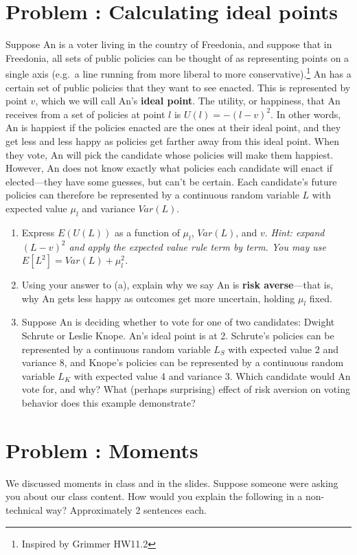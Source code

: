 \documentclass[11pt]{article}
\newcounter{problem}
\newcommand{\problem}[1]{\stepcounter{problem}\section*{Problem \theproblem: #1}}
\begin{document}
\problem{Calculating ideal points}

Suppose An is a voter living in the country of Freedonia, and suppose
that in Freedonia, all sets of public policies can be thought of as
representing points on a single axis (e.g.\ a line running from more
liberal to more conservative).\footnote{Inspired by Grimmer HW11.2} An
has a certain set of public policies that they want to see enacted.
This is represented by point $v$, which we will call An's
\textbf{ideal point}. The utility, or happiness, that An receives from
a set of policies at point $l$ is $U(l) = -(l - v)^2$. In other
words, An is happiest if the policies enacted are the ones at their
ideal point, and they get less and less happy as policies get farther
away from this ideal point. When they vote, An will pick the candidate
whose policies will make them happiest. However, An does not know
exactly what policies each candidate will enact if elected---they have
some guesses, but can't be certain. Each candidate's future policies
can therefore be represented by a continuous random variable $L$ with
expected value $\mu_l$ and variance $Var(L)$.

\begin{enumerate}[label=\alph*.]
\item Express $E(U(L))$ as a function of $\mu_l$, $Var(L)$, and
  $v$. \emph{Hint: expand $(L - v)^2$ and apply the expected value
  rule term by term. You may use $E[L^2] = Var(L) + \mu_l^2$.}

  \vspace{1.5in}

\item Using your answer to (a), explain why we say An is
  \textbf{risk averse}---that is, why An gets less happy as outcomes
  get more uncertain, holding $\mu_l$ fixed.

\item Suppose An is deciding whether to vote for one of two
  candidates: Dwight Schrute or Leslie Knope. An's ideal point is at
  2. Schrute's policies can be represented by a continuous random
  variable $L_S$ with expected value 2 and variance 8, and Knope's
  policies can be represented by a continuous random variable $L_K$
  with expected value 4 and variance 3. Which candidate would An vote
  for, and why? What (perhaps surprising) effect of risk aversion on
  voting behavior does this example demonstrate?
\end{enumerate}

\problem{Moments}

We discussed moments in class and in the slides. Suppose someone were
asking you about our class content. How would you explain the
following in a non-technical way? Approximately 2 sentences each.
\end{document}
